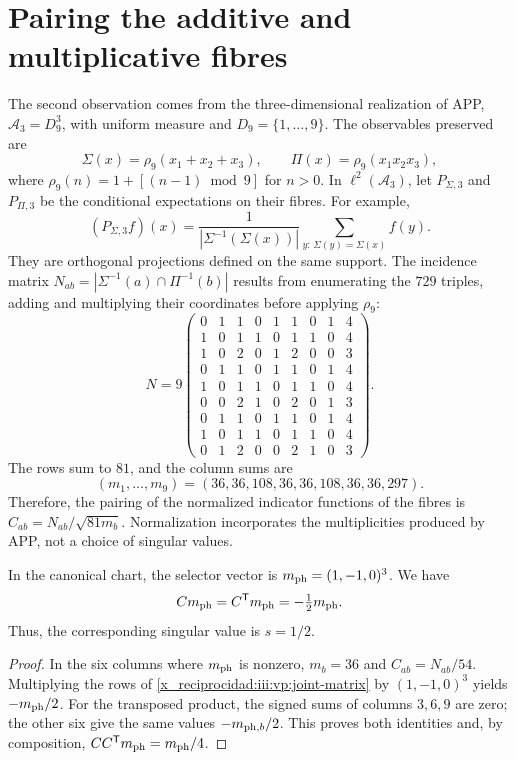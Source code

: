 \section{Pairing the additive and multiplicative fibres}

The second observation comes from the three-dimensional realization of APP,
$\mathcal A_3=D_9^3$, with uniform measure and
$D_9=\{1,\ldots,9\}$. The observables preserved are
\[
 \Sigma(x)=\rho_9(x_1+x_2+x_3),\qquad
 \Pi(x)=\rho_9(x_1x_2x_3),
\]
where $\rho_9(n)=1+[(n-1)\bmod9]$ for $n>0$. In
$\ell^2(\mathcal A_3)$, let $P_{\Sigma,3}$ and $P_{\Pi,3}$ be
the conditional expectations on their fibres. For example,
\[
 (P_{\Sigma,3}f)(x)=
 \frac1{|\Sigma^{-1}(\Sigma(x))|}
 \sum_{y:\,\Sigma(y)=\Sigma(x)}f(y).
\]
They are orthogonal projections defined on the same support. The incidence
matrix $N_{ab}=|\Sigma^{-1}(a)\cap\Pi^{-1}(b)|$ results from
enumerating the $729$ triples, adding and multiplying their coordinates before
applying $\rho_9$:
\begin{equation}
 N=9\begin{pmatrix}
 0&1&1&0&1&1&0&1&4\\
 1&0&1&1&0&1&1&0&4\\
 1&0&2&0&1&2&0&0&3\\
 0&1&1&0&1&1&0&1&4\\
 1&0&1&1&0&1&1&0&4\\
 0&0&2&1&0&2&0&1&3\\
 0&1&1&0&1&1&0&1&4\\
 1&0&1&1&0&1&1&0&4\\
 0&1&2&0&0&2&1&0&3
 \end{pmatrix}.
 \label{x_reciprocidad:iii:vp:joint-matrix}
\end{equation}
The rows sum to $81$, and the column sums are
\[
 (m_1,\ldots,m_9)=(36,36,108,36,36,108,36,36,297).
\]
Therefore, the pairing of the normalized indicator functions of the fibres
is $C_{ab}=N_{ab}/\sqrt{81m_b}$. Normalization incorporates the
multiplicities produced by APP, not a choice of singular values.

\begin{proposition}
In the canonical chart, the selector vector is
$m_{\rm ph}=(1,-1,0)^3$. We have
\begin{equation}
 Cm_{\rm ph}=C^{\mathsf T}m_{\rm ph}=-\tfrac12m_{\rm ph}.
 \label{x_reciprocidad:iii:vp:trit-mode}
\end{equation}
Thus, the corresponding singular value is $s=1/2$.
\end{proposition}
\begin{proof}
In the six columns where $m_{\rm ph}$ is nonzero, $m_b=36$ and
$C_{ab}=N_{ab}/54$. Multiplying the rows of
\eqref{x_reciprocidad:iii:vp:joint-matrix} by $(1,-1,0)^3$ yields
$-m_{\rm ph}/2$. For the transposed product, the signed sums
of columns $3,6,9$ are zero; the other six give the same
values $-m_{{\rm ph},b}/2$. This proves both identities and, by
composition, $CC^{\mathsf T}m_{\rm ph}=m_{\rm ph}/4$.
\end{proof}

